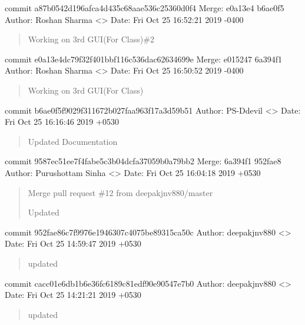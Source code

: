\documentclass[letterpaper,10pt,english]{sphinxmanual}
\begin{document}
commit a87b0542d196afca4d435c68aae536c25360d0f4
Merge: e0a13e4 b6ae0f5
Author: Roshan Sharma \textless{}\textgreater{}
Date:   Fri Oct 25 16:52:21 2019 -0400
\begin{quote}

Working on 3rd GUI(For Class)\#2
\end{quote}

commit e0a13e4dc79f32f401bbf116c536dac62634699e
Merge: e015247 6a394f1
Author: Roshan Sharma \textless{}\textgreater{}
Date:   Fri Oct 25 16:50:52 2019 -0400
\begin{quote}

Working on 3rd GUI(For Class)
\end{quote}

commit b6ae0f5f9029f311672b027faa963f17a3d59b51
Author: PS-Ddevil \textless{}\textgreater{}
Date:   Fri Oct 25 16:16:46 2019 +0530
\begin{quote}

Updated Documentation
\end{quote}

commit 9587ec51ee7f4fabe5c3b04dcfa37059b0a79bb2
Merge: 6a394f1 952fae8
Author: Purushottam Sinha \textless{}\textgreater{}
Date:   Fri Oct 25 16:04:18 2019 +0530
\begin{quote}

Merge pull request \#12 from deepakjnv880/master

Updated
\end{quote}

commit 952fae86c7f9976e1946307c4075be89315ca50c
Author: deepakjnv880 \textless{}\textgreater{}
Date:   Fri Oct 25 14:59:47 2019 +0530
\begin{quote}

updated
\end{quote}

commit cacc01e6db1b6e36fc6189c81edf90e90547e7b0
Author: deepakjnv880 \textless{}\textgreater{}
Date:   Fri Oct 25 14:21:21 2019 +0530
\begin{quote}

updated
\end{quote}
\end{document}
